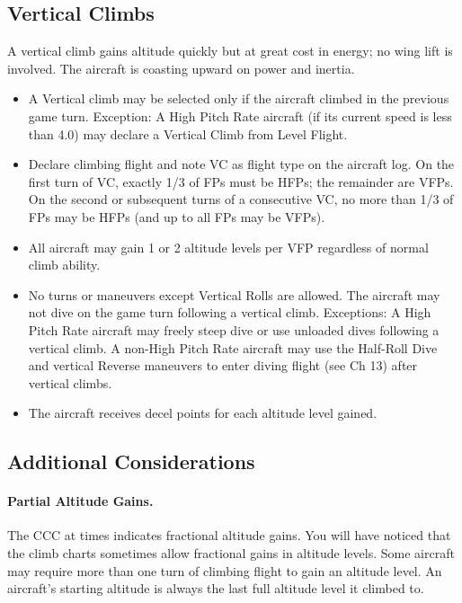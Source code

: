 \subsection{Vertical Climbs}
\label{rule:vertical-climbs}

A vertical climb gains altitude quickly but at great cost in energy; no wing lift is involved. The aircraft is coasting upward on power and inertia.

\begin{itemize}

    \item{} A Vertical climb may be selected only if the aircraft climbed in the previous game turn. Exception: A High Pitch Rate aircraft (if its current speed is less than 4.0) may declare a Vertical Climb from Level Flight.

    \item{} Declare climbing flight and note VC as flight type on the aircraft log. On the first turn of VC, exactly 1/3 of FPs must be HFPs; the remainder are VFPs. On the second or subsequent turns of a consecutive VC, no more than 1/3 of FPs may be HFPs (and up to all FPs may be VFPs).

    \item{} All aircraft may gain 1 or 2 altitude levels per VFP regardless of normal climb ability.

    \item{} No turns or maneuvers except Vertical Rolls are allowed. The aircraft may not dive on the game turn following a vertical climb. Exceptions: A High Pitch Rate aircraft may freely steep dive or use unloaded dives following a vertical climb. A non-High Pitch Rate aircraft may use the Half-Roll Dive and vertical Reverse maneuvers to enter diving flight (see Ch 13) after vertical climbs.

    \item{} The aircraft receives  decel points for each altitude level gained.

\end{itemize}

\subsection{Additional Considerations}

\paragraph{Partial Altitude Gains.} The CCC at times indicates fractional altitude gains. You will have noticed that the climb charts sometimes allow fractional gains in altitude levels. Some aircraft may require more than one turn of climbing flight to gain an altitude level. An aircraft's starting altitude is always the last full altitude level it climbed to. 

